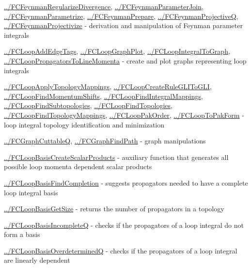 \documentclass[../FeynCalcManual.tex]{subfiles}
\begin{document}
\begin{itemize}
{  \hyperlink{../fcfeynmanregularizedivergence}{../FCFeynmanRegularizeDivergence},
  \hyperlink{../fcfeynmanparameterjoin}{../FCFeynmanParameterJoin},
  \hyperlink{../fcfeynmanparametrize}{../FCFeynmanParametrize},
  \hyperlink{../fcfeynmanprepare}{../FCFeynmanPrepare},
  \hyperlink{../fcfeynmanprojectiveq}{../FCFeynmanProjectiveQ},
  \hyperlink{../fcfeynmanprojectivize}{../FCFeynmanProjectivize} -
  derivation and manipulation of Feynman parameter integrals
\item
  \hyperlink{../fcloopaddedgetags}{../FCLoopAddEdgeTags},
  \hyperlink{../fcloopgraphplot}{../FCLoopGraphPlot},
  \hyperlink{../fcloopintegraltograph}{../FCLoopIntegralToGraph},
  \hyperlink{../fclooppropagatorstolinemomenta}{../FCLoopPropagatorsToLineMomenta}
  - create and plot graphs representing loop integrals
\item
  \hyperlink{../fcloopapplytopologymappings}{../FCLoopApplyTopologyMappings},
  \hyperlink{../fcloopcreateruleglitogli}{../FCLoopCreateRuleGLIToGLI},
  \hyperlink{../fcloopfindmomentumshifts}{../FCLoopFindMomentumShifts},
  \hyperlink{../fcloopfindintegralmappings}{../FCLoopFindIntegralMappings},
  \hyperlink{../fcloopfindsubtopologies}{../FCLoopFindSubtopologies},
  \hyperlink{../fcloopfindtopologies}{../FCLoopFindTopologies},
  \hyperlink{../fcloopfindtopologymappings}{../FCLoopFindTopologyMappings},
  \hyperlink{../fclooppakorder}{../FCLoopPakOrder},
  \hyperlink{../fclooptopakform}{../FCLoopToPakForm} - loop integral
  topology identification and minimization
\item
  \hyperlink{../fcgraphcuttableq}{../FCGraphCuttableQ},
  \hyperlink{../fcgraphfindpath}{../FCGraphFindPath} - graph
  manipulations
\item
  \hyperlink{../fcloopbasiscreatescalarproducts}{../FCLoopBasisCreateScalarProducts}
  - auxiliary function that generates all possible loop momenta
  dependent scalar products
\item
  \hyperlink{../fcloopbasisfindcompletion}{../FCLoopBasisFindCompletion}
  - suggests propagators needed to have a complete loop integral basis
\item
  \hyperlink{../fcloopbasisgetsize}{../FCLoopBasisGetSize} - returns the
  number of propagators in a topology
\item
  \hyperlink{../fcloopbasisincompleteq}{../FCLoopBasisIncompleteQ} -
  checks if the propagators of a loop integral do not form a basis
\item
  \hyperlink{../fcloopbasisoverdeterminedq}{../FCLoopBasisOverdeterminedQ}
  - checks if the propagators of a loop integral are linearly dependent
}
\end{itemize}
\end{document}
